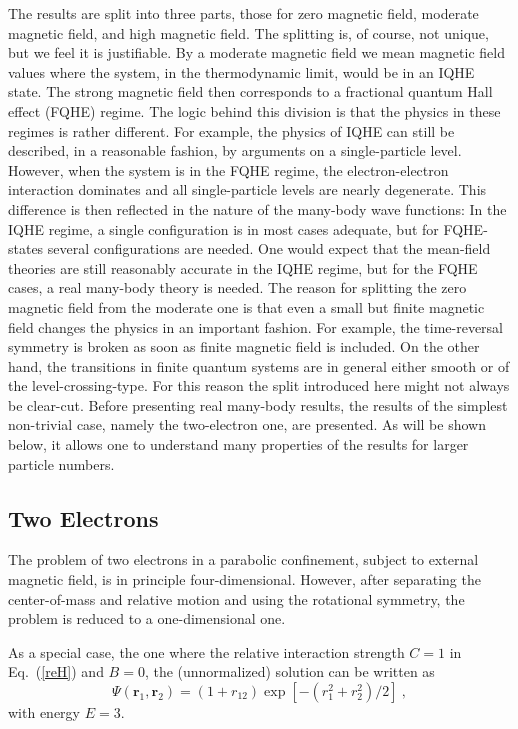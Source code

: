 \documentclass{article}
\begin{document}
The results are split into three parts, those for zero magnetic field,
moderate magnetic field, and high magnetic field. The splitting is, of
course, not unique, but we feel it is justifiable. By a moderate
magnetic field we mean magnetic field values where the system, in the
thermodynamic limit, would be in an IQHE state. The strong magnetic
field then corresponds to a fractional quantum Hall effect (FQHE)
regime. The logic behind this division is that the physics in these
regimes is rather different.  For example, the physics of IQHE can
still be described, in a reasonable fashion, by arguments on a
single-particle level. However, when the system is in the FQHE regime,
the electron-electron interaction dominates and all single-particle
levels are nearly degenerate. This difference is then reflected in the
nature of the many-body wave functions: In the IQHE regime, a single
configuration is in most cases adequate, but for FQHE-states several
configurations are needed. One would expect that the mean-field
theories are still reasonably accurate in the IQHE regime, but for the
FQHE cases, a real many-body theory is needed. The reason for
splitting the zero magnetic field from the moderate one is that even a
small but finite magnetic field changes the physics in an important
fashion. For example, the time-reversal symmetry is broken as soon as
finite magnetic field is included. On the other hand, the transitions
in finite quantum systems are in general either smooth or of the
level-crossing-type. For this reason the split introduced here might
not always be clear-cut. Before presenting real many-body results, the
results of the simplest non-trivial case, namely the two-electron one,
are presented. As will be shown below, it allows one to understand
many properties of the results for larger particle numbers.

\subsection{Two Electrons}\label{twoe}

The problem of two electrons in a parabolic confinement, subject to
external magnetic field, is in principle four-dimensional. However,
after separating the center-of-mass and relative motion and using the
rotational symmetry, the problem is reduced to a one-dimensional one.

As a special case, the one where the relative interaction strength
$C=1$ in Eq.~(\ref{reH}) and $B=0$, the (unnormalized) solution can be
written as
\begin{equation}
\Psi(\mathbf{r}_1,\mathbf{r}_2) = (1+r_{12}) \exp[-(r_1^2+r_2^2)/2] \ ,
\end{equation}
with energy $E=3$.
\end{document}
